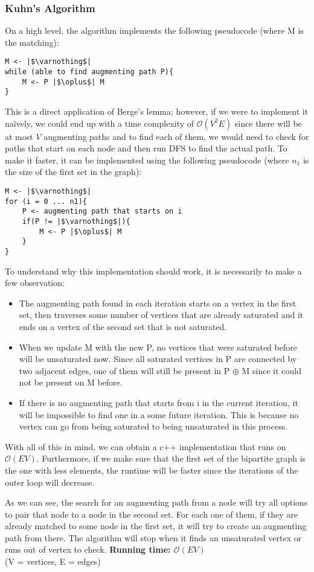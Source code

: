 \newpage
\subsubsection{Kuhn's Algorithm}
On a high level, the algorithm implements the following pseudocode 
(where M is the matching):
\begin{verbatim}
M <- |$\varnothing$|
while (able to find augmenting path P){
	M <- P |$\oplus$| M
}
\end{verbatim}
This is a direct application of Berge's lemma; however, if we were to 
implement it naïvely, we could end up with a time complexity of 
$\mathcal{O}(V^2E)$ since there will be at most $V$ augmenting paths
and to find each of them, we would need to check for paths that start 
on each node and then run DFS to find the actual path.
To make it faster, it can be implemented using the following 
pseudocode (where $n_1$ is the size of the first set in the graph):
\begin{verbatim}
M <- |$\varnothing$|
for (i = 0 ... n1){
	P <- augmenting path that starts on i
	if(P != |$\varnothing$|){
		M <- P |$\oplus$| M
	}
}
\end{verbatim}
To understand why this implementation should work, it is necessarily to
make a few observation:
\begin{itemize}
		\setlength{\itemsep}{2pt}
		\item The augmenting path found in each iteration starts on a 
				vertex in the first set, then traverses some number
				of vertices that are already saturated and it ends
				on a vertex of the second set that is not saturated.
		\item When we update M with the new P, no vertices that were
				saturated before will be unsaturated now.  Since
				all saturated vertices in P are connected by two 
				adjacent edges, one of them will still be present 
				in P $\oplus$ M since it could not be present on M before.
		\item If there is no augmenting path that starts from i in the 
				current iteration, it will be impossible to find one 
				in a some future iteration. This is because no vertex 
				can go from being saturated to being unsaturated in this
				process.
\end{itemize}
With all of this in mind, we can obtain a c++ implementation that runs on 
$\mathcal{O}(EV)$. Furthermore, if we make sure that the first set of the
bipartite graph is the one with less elements, the runtime will be faster
since the iterations of the outer loop will decrease.

As we can see, the search for an augmenting path from a node will try
all options to pair that node to a node in the second set. For each one
of them, if they are already matched to some node in the first set, 
it will try to create an augmenting path from there. The algorithm will
stop when it finds an unsaturated vertex or runs out of vertex to check.
\newpage
{}
\noindent \textbf{\boldmath Running time: $\mathcal{O}(EV)$}
\\ {\small(V = vertices, E = edges)}






